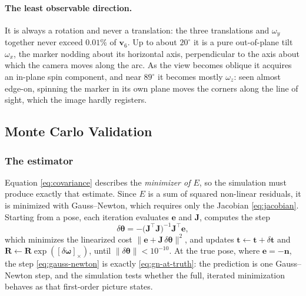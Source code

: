 \documentclass[11pt,a4paper]{article}
\theoremstyle{definition}
\theoremstyle{plain}
\theoremstyle{remark}
\begin{document}
\paragraph{The least observable direction.} It is always a rotation and never a
translation: the three translations and $\omega_y$ together never exceed
$0.01\%$ of $\mathbf{v}_6$. Up to about $20^\circ$ it is a pure out-of-plane tilt
$\omega_x$, the marker nodding about its horizontal axis, perpendicular to the
axis about which the camera moves along the arc. As the view becomes oblique it
acquires an in-plane spin component, and near $89^\circ$ it becomes mostly
$\omega_z$: seen almost edge-on, spinning the marker in its own plane moves the
corners along the line of sight, which the image hardly registers.

\subsection{Monte Carlo Validation}
\label{sec:montecarlo}

\subsubsection{The estimator}

Equation \eqref{eq:covariance} describes the \emph{minimizer of $E$}, so the
simulation must produce exactly that estimate. Since $E$ is a sum of squared
non-linear residuals, it is minimized with Gauss--Newton, which requires only
the Jacobian \eqref{eq:jacobian}. Starting from a pose, each iteration evaluates
$\mathbf{e}$ and $\mathbf{J}$, computes the step
\begin{equation}
  \delta\boldsymbol{\theta}
  = -\big(\mathbf{J}^\top\mathbf{J}\big)^{-1}\mathbf{J}^\top\mathbf{e},
  \label{eq:gauss-newton}
\end{equation}
which minimizes the linearized cost $\|\mathbf{e}+\mathbf{J}\,\delta\boldsymbol{\theta}\|^2$,
and updates $\mathbf{t}\leftarrow\mathbf{t}+\delta\mathbf{t}$ and
$\mathbf{R}\leftarrow\mathbf{R}\exp([\delta\boldsymbol{\omega}]_\times)$, until
$\|\delta\boldsymbol{\theta}\| < 10^{-10}$. At the true pose, where
$\mathbf{e} = -\mathbf{n}$, the step \eqref{eq:gauss-newton} is exactly
\eqref{eq:gn-at-truth}: the prediction is one Gauss--Newton step, and the
simulation tests whether the full, iterated minimization behaves as that
first-order picture states.
\end{document}
